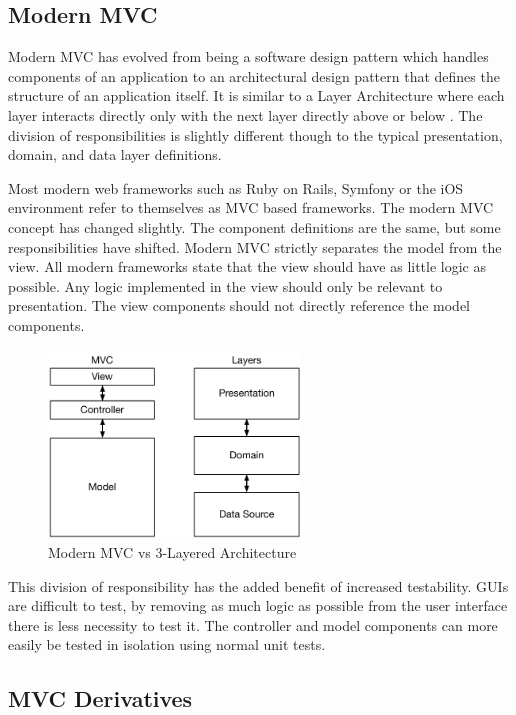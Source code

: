 \subsection{Modern MVC}

Modern MVC has evolved from being a software design pattern which handles components of an application to an architectural design pattern that defines the structure of an application itself. It is similar to a Layer Architecture where each layer interacts directly only with the next layer directly above or below \cite{patterns}. The division of responsibilities is slightly different though to the typical presentation, domain, and data layer definitions.

Most modern web frameworks such as Ruby on Rails, Symfony or the iOS environment refer to themselves as MVC based frameworks. The modern MVC concept has changed slightly. The component definitions are the same, but some responsibilities have shifted. Modern MVC strictly separates the model from the view. All modern frameworks state that the view should have as little logic as possible. Any logic implemented in the view should only be relevant to presentation. The view components should not directly reference the model components\cite{apple_MVC}\cite{symfony_MVC}.


\begin{figure}[H]
    \centering
    \includegraphics[height=5cm,keepaspectratio]{assets/concept/mvc_2.pdf}
    \caption{Modern MVC vs 3-Layered Architecture}
    \label{fig:mvc_2}
\end{figure}

This division of responsibility has the added benefit of increased testability. GUIs are difficult to test, by removing as much logic as possible from the user interface there is less necessity to test it. The controller and model components can more easily be tested in isolation using normal unit tests\cite{mvp_testing}.

\subsection{MVC Derivatives}

